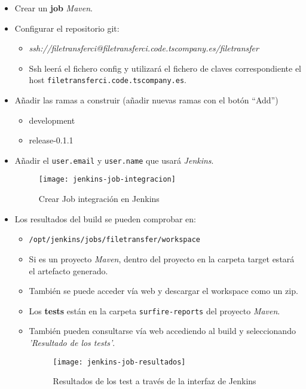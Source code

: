 \begin{itemize}
	\item Crear un \textbf{job} \emph{Maven}.
	\item Configurar el repositorio git:
        \begin{itemize}
	        \item \emph{ssh://filetransferci@filetransferci.code.tscompany.es/filetransfer}
	        \item Ssh leerá el fichero config y utilizará el fichero de claves correspondiente el host \texttt{filetransferci.code.tscompany.es}.
        \end{itemize}
	\item Añadir las ramas a construir (añadir nuevas ramas con el botón ``Add'')
        \begin{itemize}
	        \item development
	        \item release-0.1.1
        \end{itemize}
	\item Añadir el \texttt{user.email} y \texttt{user.name} que usará \emph{Jenkins}.
        \begin{figure}[H]
            \centering
            \texttt{[image: jenkins-job-integracion]}
            \caption{Crear Job integración en Jenkins}
            \label{fg:jenkins-job-integracion}
        \end{figure}
	\item Los resultados del build se pueden comprobar en: 
        \begin{itemize}
	        \item \texttt{/opt/jenkins/jobs/filetransfer/workspace}
	        \item Si es un proyecto \emph{Maven}, dentro del proyecto en la carpeta target estará el artefacto generado.
	        \item También se puede acceder vía web y descargar el workspace como un zip.
	        \item Los \textbf{tests} están en la carpeta \texttt{surfire-reports} del proyecto \emph{Maven}.
	        \item También pueden consultarse vía web accediendo al build y seleccionando \emph{'Resultado de los tests'}.
        \begin{figure}[H]
            \centering
            \texttt{[image: jenkins-job-resultados]}
            \caption{Resultados de los test a través de la interfaz de Jenkins}
            \label{fig:jenkins-job-resultados}
        \end{figure}
        \end{itemize}
\end{itemize}

